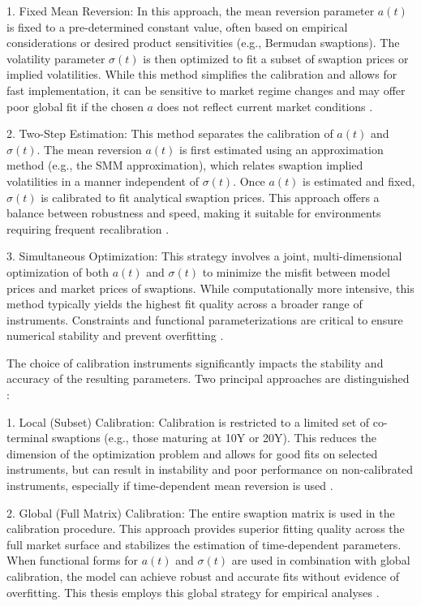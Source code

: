 1. Fixed Mean Reversion: In this approach, the mean reversion parameter $a(t)$ is fixed to a pre-determined constant value, often based on empirical considerations or desired product sensitivities (e.g., Bermudan swaptions). The volatility parameter $\sigma(t)$ is then optimized to fit a subset of swaption prices or implied volatilities. While this method simplifies the calibration and allows for fast implementation, it can be sensitive to market regime changes and may offer poor global fit if the chosen $a$ does not reflect current market conditions \parencite[p.~13]{gurrieri2009calibration}.

2. Two-Step Estimation: This method separates the calibration of $a(t)$ and $\sigma(t)$. The mean reversion $a(t)$ is first estimated using an approximation method (e.g., the SMM approximation), which relates swaption implied volatilities in a manner independent of $\sigma(t)$. Once $a(t)$ is estimated and fixed, $\sigma(t)$ is calibrated to fit analytical swaption prices. This approach offers a balance between robustness and speed, making it suitable for environments requiring frequent recalibration \parencite[pp.~13--14]{gurrieri2009calibration}.

3. Simultaneous Optimization: This strategy involves a joint, multi-dimensional optimization of both $a(t)$ and $\sigma(t)$ to minimize the misfit between model prices and market prices of swaptions. While computationally more intensive, this method typically yields the highest fit quality across a broader range of instruments. Constraints and functional parameterizations are critical to ensure numerical stability and prevent overfitting \parencite[p.~14]{gurrieri2009calibration}.

The choice of calibration instruments significantly impacts the stability and accuracy of the resulting parameters. Two principal approaches are distinguished \parencite[p.~16]{gurrieri2009calibration}:

1. Local (Subset) Calibration: Calibration is restricted to a limited set of co-terminal swaptions (e.g., those maturing at 10Y or 20Y). This reduces the dimension of the optimization problem and allows for good fits on selected instruments, but can result in instability and poor performance on non-calibrated instruments, especially if time-dependent mean reversion is used \parencite[pp.~16--24]{gurrieri2009calibration}.

2. Global (Full Matrix) Calibration: The entire swaption matrix is used in the calibration procedure. This approach provides superior fitting quality across the full market surface and stabilizes the estimation of time-dependent parameters. When functional forms for $a(t)$ and $\sigma(t)$ are used in combination with global calibration, the model can achieve robust and accurate fits without evidence of overfitting. This thesis employs this global strategy for empirical analyses \parencite[pp.~24--29]{gurrieri2009calibration}.

